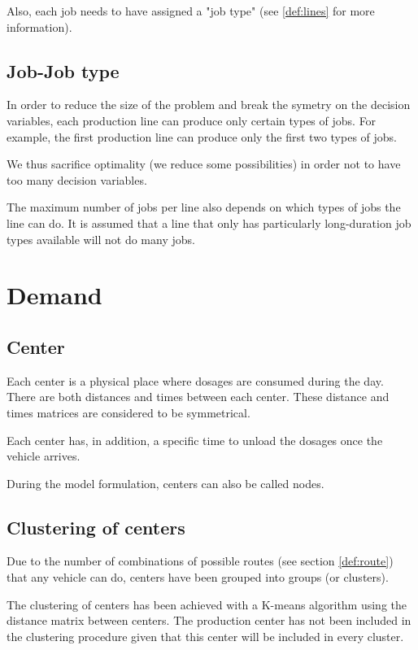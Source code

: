 Also, each job needs to have assigned a "job type" (see \ref{def:lines} for more information).

\subsection{Job-Job type}

In order to reduce the size of the problem and break the symetry on the decision variables, each production line can produce only certain types of jobs. For example, the first production line can produce only the first two types of jobs.

We thus sacrifice optimality (we reduce some possibilities) in order not to have too many decision variables.

The maximum number of jobs per line also depends on which types of jobs the line can do. It is assumed that a line that only has particularly long-duration job types available will not do many jobs.

\section{Demand}

\subsection{Center}

Each center is a physical place where dosages are consumed during the day. There are both distances and times between each center. These distance and times matrices are considered to be symmetrical.

Each center has, in addition, a specific time to unload the dosages once the vehicle arrives.

During the model formulation, centers can also be called nodes.

\subsection{Clustering of centers}
\label{def:cluster}

Due to the number of combinations of possible routes (see section \ref{def:route}) that any vehicle can do, centers have been grouped into groups (or clusters).

The clustering of centers has been achieved with a K-means algorithm using the distance matrix between centers. The production center has not been included in the clustering procedure given that this center will be included in every cluster.

